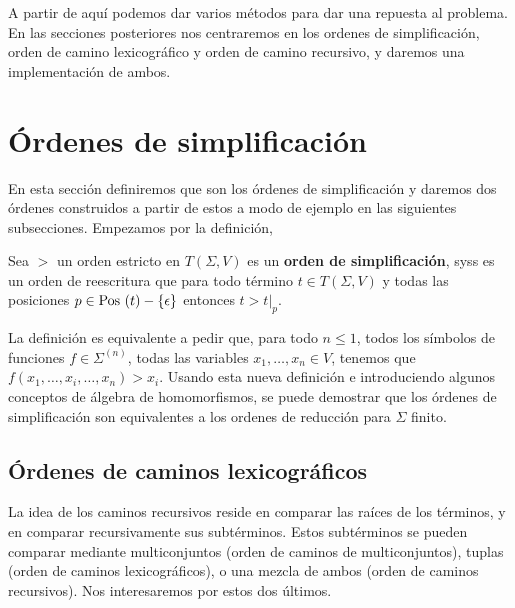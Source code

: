 A partir de aquí podemos dar varios métodos para dar una repuesta al
problema. En las secciones posteriores nos centraremos en los ordenes
de simplificación, orden de camino lexicográfico y orden de camino
recursivo, y daremos una implementación de ambos.

\section{Órdenes de simplificación}

En esta sección definiremos que son los órdenes de simplificación y
daremos dos órdenes construidos a partir de estos a modo de ejemplo en
las siguientes subsecciones. Empezamos por la definición,

\begin{defi}
  Sea $>$ un orden estricto en $T(\Sigma, V)$ es un \textbf{orden de
  simplificación}, syss es un orden de reescritura que para todo
  término $t \in T(\Sigma, V)$ y todas las posiciones
  $p \in \mbox{Pos }(t) - \{ \epsilon \}$ entonces $t > t|_p$.
\end{defi}

La definición es equivalente a pedir que, para todo $n \leq 1$, todos
los símbolos de funciones $f \in \Sigma^{(n)}$, todas las variables
$x_1, \dots, x_n \in V$, tenemos que
$f(x_1, \dots, x_i, \dots, x_n) > x_i$. Usando esta nueva definición e
introduciendo algunos conceptos de álgebra de homomorfismos, se puede
demostrar que los órdenes de simplificación son equivalentes a los
ordenes de reducción para $\Sigma$ finito.

\subsection{Órdenes de caminos lexicográficos}

La idea de los caminos recursivos reside en comparar las raíces de los
términos, y en comparar recursivamente sus subtérminos. Estos
subtérminos se pueden comparar mediante multiconjuntos (orden de
caminos de multiconjuntos), tuplas (orden de caminos lexicográficos),
o una mezcla de ambos (orden de caminos recursivos). Nos interesaremos
por estos dos últimos.


